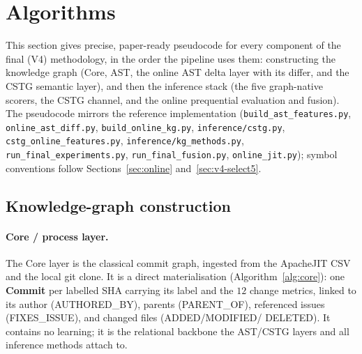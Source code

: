 \documentclass[11pt,a4paper]{article}
\newcommand{\code}[1]{\texttt{#1}}
\newcommand{\node}[1]{\textcolor{kgblue}{\textbf{#1}}}
\newcommand{\edge}[1]{\textsc{#1}}
\begin{document}
	\section{Algorithms}\label{sec:algorithms}
	This section gives precise, paper-ready pseudocode for every component of the
	final (V4) methodology, in the order the pipeline uses them: constructing the
	knowledge graph (Core, AST, the online AST delta layer with its differ, and the
	CSTG semantic layer), and then the inference stack (the five graph-native
	scorers, the CSTG channel, and the online prequential evaluation and fusion). The
	pseudocode mirrors the reference implementation
	(\code{build\_ast\_features.py}, \code{online\_ast\_diff.py},
	\code{build\_online\_kg.py}, \code{inference/cstg.py},
	\code{cstg\_online\_features.py}, \code{inference/kg\_methods.py},
	\code{run\_final\_experiments.py}, \code{run\_final\_fusion.py},
	\code{online\_jit.py}); symbol conventions follow Sections~\ref{sec:online}
	and~\ref{sec:v4-select5}.

	\subsection{Knowledge-graph construction}\label{sec:algo-build}

	\paragraph{Core / process layer.} The Core layer is the classical commit graph,
	ingested from the ApacheJIT CSV and the local git clone. It is a direct
	materialisation (Algorithm~\ref{alg:core}): one \node{Commit} per labelled SHA
	carrying its label and the $12$ change metrics, linked to its author
	(\edge{AUTHORED\_BY}), parents (\edge{PARENT\_OF}), referenced issues
	(\edge{FIXES\_ISSUE}), and changed files (\edge{ADDED}/\edge{MODIFIED}/%
	\edge{DELETED}). It contains no learning; it is the relational backbone the
	AST/CSTG layers and all inference methods attach to.
\end{document}
